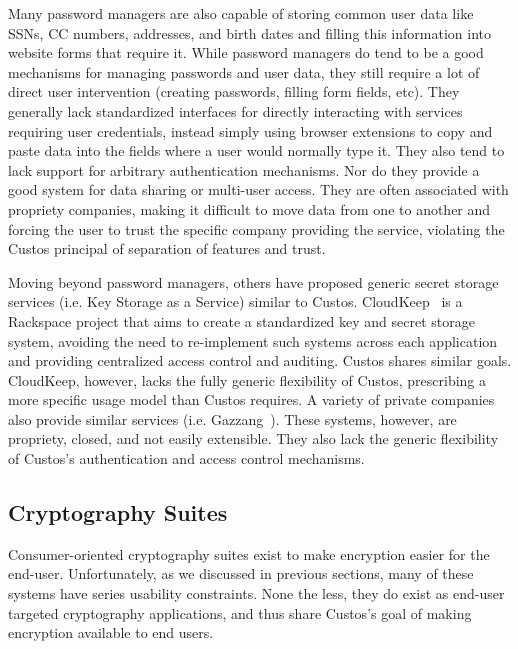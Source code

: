 Many password managers are also capable of storing common user data
like SSNs, CC numbers, addresses, and birth dates and filling this
information into website forms that require it. While password
managers do tend to be a good mechanisms for managing passwords and
user data, they still require a lot of direct user intervention
(creating passwords, filling form fields, etc). They generally lack
standardized interfaces for directly interacting with services
requiring user credentials, instead simply using browser extensions to
copy and paste data into the fields where a user would normally type
it. They also tend to lack support for arbitrary authentication
mechanisms. Nor do they provide a good system for data sharing or
multi-user access. They are often associated with propriety companies,
making it difficult to move data from one to another and forcing the
user to trust the specific company providing the service, violating
the Custos principal of separation of features and trust.

Moving beyond password managers, others have proposed generic secret
storage services (i.e. Key Storage as a Service) similar to Custos.
CloudKeep~\cite{cloudkeep-presentation, cloudkeep} is a Rackspace
project that aims to create a standardized key and secret storage
system, avoiding the need to re-implement such systems across each
application and providing centralized access control and
auditing. Custos shares similar goals. CloudKeep, however, lacks the
fully generic flexibility of Custos, prescribing a more specific usage
model than Custos requires. A variety of private companies also
provide similar services (i.e. Gazzang~\cite{gazzang}). These systems,
however, are propriety, closed, and not easily extensible. They also
lack the generic flexibility of Custos's authentication and access
control mechanisms.

\subsection{Cryptography Suites}

Consumer-oriented cryptography suites exist to make encryption easier
for the end-user. Unfortunately, as we discussed in previous sections,
many of these systems have series usability constraints. None the
less, they do exist as end-user targeted cryptography applications,
and thus share Custos's goal of making encryption available to end
users.


